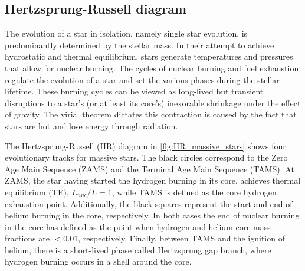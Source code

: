 \subsection{Hertzsprung-Russell diagram}

The evolution of a star in isolation, namely single star evolution, is predominantly determined by the stellar mass. In their attempt to achieve hydrostatic and thermal equilibrium, stars generate temperatures and pressures that allow for nuclear burning. The cycles of nuclear burning and fuel exhaustion regulate the evolution of a star and set the various phases during the stellar lifetime. These burning cycles can be viewed as long-lived but transient disruptions to a star's (or at least its core's) inexorable shrinkage under the effect of gravity. The virial theorem dictates this contraction is caused by the fact that stars are hot and lose energy through radiation. 

The Hertzsprung-Russell (HR) diagram in \cref{fig:HR_massive_stars} shows four evolutionary tracks for massive stars. The black circles correspond to the Zero Age Main Sequence (ZAMS) and the Terminal Age Main Sequence (TAMS). At ZAMS, the star having started the hydrogen burning in its core, achieves thermal equilibrium (TE), $L_{nuc}/L =1$, while TAMS is defined as the core hydrogen exhaustion point. Additionally, the black squares represent the start and end of helium burning in the core, respectively. In both cases the end of nuclear burning in the core has defined as the point when hydrogen and helium core mass fractions are $< 0.01$, respectively. Finally, between TAMS and the ignition of helium, there is a short-lived phase called Hertzsprung gap branch, where hydrogen burning occurs in a shell around the core. 

